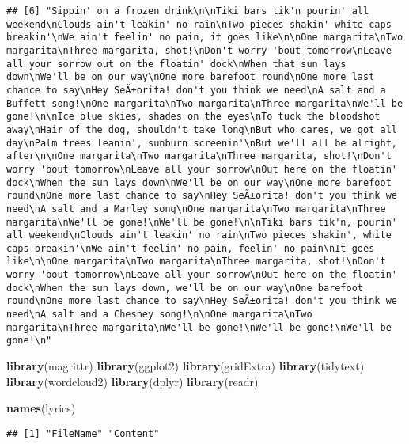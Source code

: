 \documentclass[]{article}
\newenvironment{Shaded}{\begin{snugshade}}{\end{snugshade}}
\newcommand{\KeywordTok}[1]{\textcolor[rgb]{0.13,0.29,0.53}{\textbf{#1}}}
\newcommand{\NormalTok}[1]{#1}
\begin{document}
\begin{verbatim}
## [6] "Sippin' on a frozen drink\n\nTiki bars tik'n pourin' all weekend\nClouds ain't leakin' no rain\nTwo pieces shakin' white caps breakin'\nWe ain't feelin' no pain, it goes like\n\nOne margarita\nTwo margarita\nThree margarita, shot!\nDon't worry 'bout tomorrow\nLeave all your sorrow out on the floatin' dock\nWhen that sun lays down\nWe'll be on our way\nOne more barefoot round\nOne more last chance to say\nHey SeÃ±orita! don't you think we need\nA salt and a Buffett song!\nOne margarita\nTwo margarita\nThree margarita\nWe'll be gone!\n\nIce blue skies, shades on the eyes\nTo tuck the bloodshot away\nHair of the dog, shouldn't take long\nBut who cares, we got all day\nPalm trees leanin', sunburn screenin'\nBut we'll all be alright, after\n\nOne margarita\nTwo margarita\nThree margarita, shot!\nDon't worry 'bout tomorrow\nLeave all your sorrow\nOut here on the floatin' dock\nWhen the sun lays down\nWe'll be on our way\nOne more barefoot round\nOne more last chance to say\nHey SeÃ±orita! don't you think we need\nA salt and a Marley song\nOne margarita\nTwo margarita\nThree margarita\nWe'll be gone!\nWe'll be gone!\n\nTiki bars tik'n, pourin' all weekend\nClouds ain't leakin' no rain\nTwo pieces shakin', white caps breakin'\nWe ain't feelin' no pain, feelin' no pain\nIt goes like\n\nOne margarita\nTwo margarita\nThree margarita, shot!\nDon't worry 'bout tomorrow\nLeave all your sorrow\nOut here on the floatin' dock\nWhen the sun lays down, we'll be on our way\nOne barefoot round\nOne more last chance to say\nHey SeÃ±orita! don't you think we need\nA salt and a Chesney song!\n\nOne margarita\nTwo margarita\nThree margarita\nWe'll be gone!\nWe'll be gone!\nWe'll be gone!\n"
\end{verbatim}

\begin{Shaded}
\begin{Highlighting}[]
\KeywordTok{library}\NormalTok{(magrittr)}
\KeywordTok{library}\NormalTok{(ggplot2)}
\KeywordTok{library}\NormalTok{(gridExtra)}
\KeywordTok{library}\NormalTok{(tidytext)}
\KeywordTok{library}\NormalTok{(wordcloud2)}
\KeywordTok{library}\NormalTok{(dplyr)}
\KeywordTok{library}\NormalTok{(readr)}

\KeywordTok{names}\NormalTok{(lyrics)}
\end{Highlighting}
\end{Shaded}

\begin{verbatim}
## [1] "FileName" "Content"
\end{verbatim}
\end{document}
